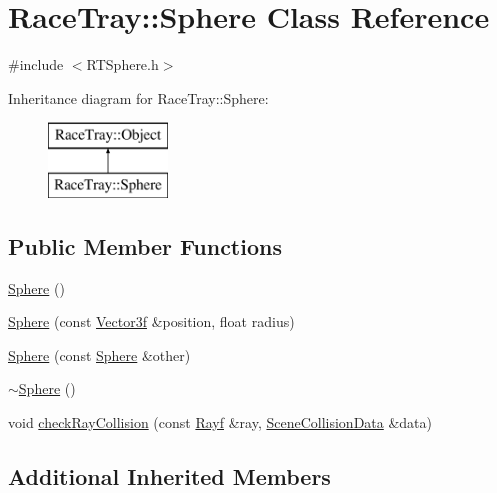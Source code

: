 \hypertarget{class_race_tray_1_1_sphere}{\section{Race\-Tray\-:\-:Sphere Class Reference}
\label{class_race_tray_1_1_sphere}
}


{\ttfamily \#include $<$R\-T\-Sphere.\-h$>$}

Inheritance diagram for Race\-Tray\-:\-:Sphere\-:\begin{figure}[H]
\begin{center}
\leavevmode
\includegraphics[height=2.000000cm]{class_race_tray_1_1_sphere}
\end{center}
\end{figure}
\subsection*{Public Member Functions}
\begin{DoxyCompactItemize}
\item 
\hyperlink{class_race_tray_1_1_sphere_ab4eadefc469c162c0dfc943d90a88279}{Sphere} ()
\item 
\hyperlink{class_race_tray_1_1_sphere_a80375db61b09ba29ee6dacae567e28b8}{Sphere} (const \hyperlink{group___math_gadb6fa781064c3c3c9b13eb984adae162}{Vector3f} \&position, float radius)
\item 
\hyperlink{class_race_tray_1_1_sphere_a29714dd1da1688b1e150f2f32d6ce05a}{Sphere} (const \hyperlink{class_race_tray_1_1_sphere}{Sphere} \&other)
\item 
\hyperlink{class_race_tray_1_1_sphere_a6b6f93c73945477e091934e26cbe46f2}{$\sim$\-Sphere} ()
\item 
void \hyperlink{class_race_tray_1_1_sphere_a88cf632d6caf1ec6a0ce46efafd6f052}{check\-Ray\-Collision} (const \hyperlink{group___math_ga5fdea6c2a8db84c0cc5b7aaeeb48b17a}{Rayf} \&ray, \hyperlink{class_race_tray_1_1_scene_collision_data}{Scene\-Collision\-Data} \&data)
\end{DoxyCompactItemize}
\subsection*{Additional Inherited Members}


